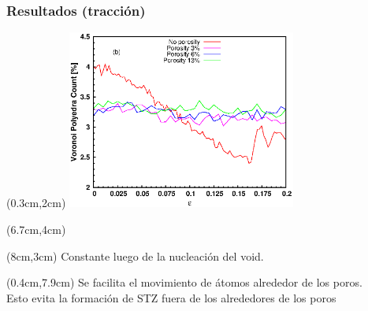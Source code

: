 \begin{frame}
    \frametitle{Resultados (tracci\'on)}
    \begin{textblock*}{7.5cm}(0.3cm,2cm) %
        \includegraphics[width=7.5cm]{Presentacion_PANACM_Franco/tipe3_strain_tens.eps}
    \end{textblock*}
    \begin{textblock*}{4.2cm}(6.7cm,4cm) %
    \end{textblock*}
    \begin{textblock*}{5cm}(8cm,3cm) %
        Constante luego de la nucleaci\'on del void.
    \end{textblock*}
    \begin{textblock*}{12cm}(0.4cm,7.9cm) %
    \centering
	Se facilita el movimiento de \'atomos alrededor de los poros.\\
	Esto evita la formaci\'on de STZ fuera de los alrededores de los poros
    \end{textblock*}
\end{frame}




